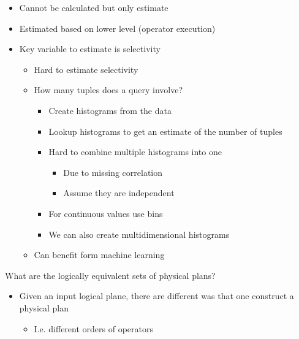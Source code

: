 \begin{itemize}
\begin{itemize}
            \item Cannot be calculated but only estimate
            \item Estimated based on lower level (operator execution)
            \item Key variable to estimate is selectivity
                \begin{itemize}
                    \item Hard to estimate selectivity
                \end{itemize}
                \begin{itemize}
                    \item How many tuples does a query involve?
                        \begin{itemize}
                            \item Create histograms from the data
                            \item Lookup histograms to get an estimate of the number of tuples
                            \item Hard to combine multiple histograms into one
                                \begin{itemize}
                                    \item Due to missing correlation
                                    \item Assume they are independent
                                \end{itemize}
                            \item For continuous values use bins
                            \item We can also create multidimensional histograms
                        \end{itemize}
                    \item Can benefit form machine learning
                \end{itemize}
        \end{itemize}
     What are the logically equivalent sets of physical plans?
        \begin{itemize}
            \item Given an input logical plane, there are different was that one construct a physical plan
                \begin{itemize}
                    \item I.e. different orders of operators

\end{itemize}
\end{itemize}
\end{itemize}
